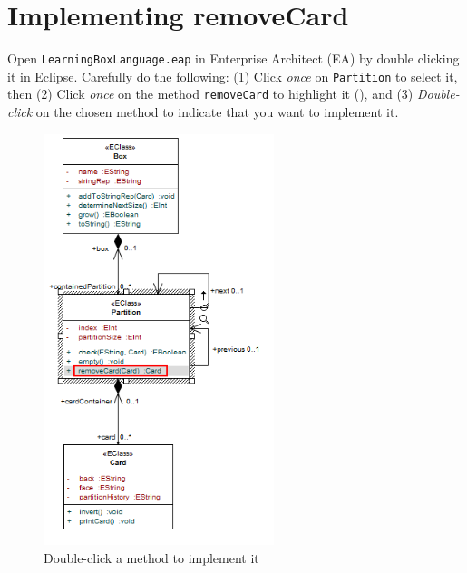 \newpage
\hypertarget{remCard vis}{}
\section{Implementing removeCard}
\genHeader

\begin{stepbystep}

\item Open \texttt{LearningBoxLanguage.eap} in Enterprise Architect (EA) by dou\-ble clicking it in Eclipse. Carefully do the
following: (1) Click \emph{once} on \texttt{Partition} to select it, then (2) Click \emph{once} on the method \texttt{removeCard} to highlight it
(), and (3) \emph{Double-click} on the chosen method to indicate that you want to implement it.

\begin{figure}[htp]
\begin{center}
  \includegraphics[width=0.6\textwidth]{../../org.moflon.doc.handbook.03_storyDiagrams/03_removeCard/visRemImages/ea_startSDM}
  \caption{Double-click a method to implement it}  
  \label{ea:sdm_start}
\end{center}
\end{figure}
 

\end{stepbystep}
